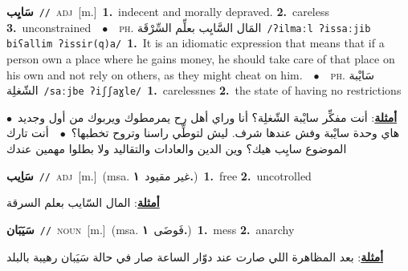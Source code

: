 \documentclass[10pt,a4paper,twoside]{article} %
\begin{document}
\begin{multicols}{2}
{\setlength\topsep{0pt}\textbf{\foreignlanguage{arabic}{سَايِب}}\ {\color{gray}\texttt{//}\color{black}}\ \textsc{adj}\ [m.]\ \textbf{1.}~indecent and morally depraved.  \textbf{2.}~careless  \textbf{3.}~unconstrained\ \ $\bullet$\ \ \textsc{ph.} \color{gray} \foreignlanguage{arabic}{المَال السَّايِب بعلِّم السِّرْقَة}\color{black}\ {\color{gray}\texttt{/{\sffamily ʔilmaːl ʔissaːjib biʕallim ʔissir(q)a}/}\color{black}}\ \textbf{1.}~It is an idiomatic expression that means that if a person own a place where he gains money, he should take care of that place on his own and not rely on others, as they might cheat on him.\ \ $\bullet$\ \ \textsc{ph.} \color{gray} \foreignlanguage{arabic}{سَايْبة الشّغلِة}\color{black}\ {\color{gray}\texttt{/{\sffamily saːjbe ʔiʃʃaɣle}/}\color{black}}\ \textbf{1.}~carelessnes  \textbf{2.}~the state of having no restrictions\  \begin{flushright}\color{gray}\foreignlanguage{arabic}{\textbf{\underline{\foreignlanguage{arabic}{أمثلة}}}: أنت مفكِّر سايْبة الشّغلِة؟ أنا وراي أهل رح يمرمطوك ويربوك من أول وجديد\ $\bullet$\ \  هاي وحدة سايْبة وفش عندها شرف. ليش لتوطِّي راسنا وتروح تخطبها؟\ $\bullet$\ \  أنت تارك الموضوع سايِب هيك؟ وين الدين والعادات والتقاليد ولا بطلوا مهمين عندك}\end{flushright}\color{black}} \vspace{2mm}

{\setlength\topsep{0pt}\textbf{\foreignlanguage{arabic}{سَاِيب}}\ {\color{gray}\texttt{//}\color{black}}\ \textsc{adj}\ [m.]\ \color{gray}(msa. \foreignlanguage{arabic}{غير مقيود}~\foreignlanguage{arabic}{\textbf{١.}})\color{black}\ \textbf{1.}~free  \textbf{2.}~uncotrolled\  \begin{flushright}\color{gray}\foreignlanguage{arabic}{\textbf{\underline{\foreignlanguage{arabic}{أمثلة}}}: المال السّايب بعلم السرقة}\end{flushright}\color{black}} \vspace{2mm}

{\setlength\topsep{0pt}\textbf{\foreignlanguage{arabic}{سَيَبَان}}\ {\color{gray}\texttt{//}\color{black}}\ \textsc{noun}\ [m.]\ \color{gray}(msa. \foreignlanguage{arabic}{فَوضَى}~\foreignlanguage{arabic}{\textbf{١.}})\color{black}\ \textbf{1.}~mess  \textbf{2.}~anarchy\  \begin{flushright}\color{gray}\foreignlanguage{arabic}{\textbf{\underline{\foreignlanguage{arabic}{أمثلة}}}: بعد المظاهرة اللي صارت عند دوّار الساعة صار في حالة سَيَبان رهيبة بالبلد}\end{flushright}\color{black}} \vspace{2mm}


\end{multicols}
\end{document}
